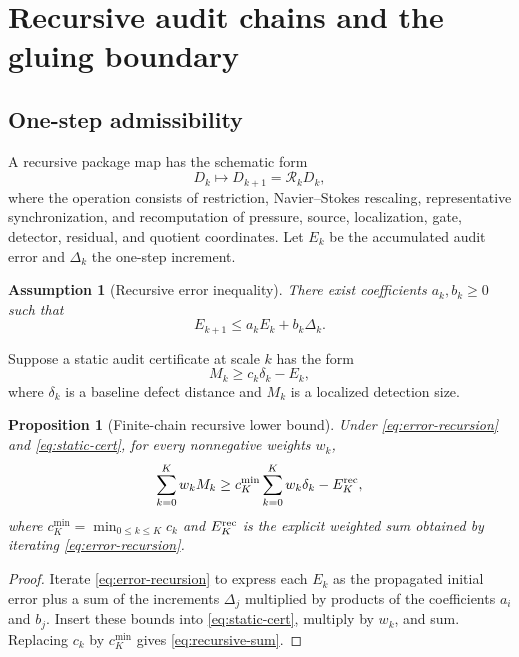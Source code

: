 \documentclass[11pt]{article}
\numberwithin{equation}{section}
\newtheorem{proposition}[theorem]{Proposition}
\newtheorem{assumption}[theorem]{Assumption}
\theoremstyle{remark}
\newcommand{\calR}{\mathcal R}
\begin{document}
\section{Recursive audit chains and the gluing boundary}\label{sec:recursive}

\subsection{One-step admissibility}

A recursive package map has the schematic form
\begin{equation}\label{eq:one-step-map}
D_k\longmapsto D_{k+1}=\calR_kD_k,
\end{equation}
where the operation consists of restriction, Navier--Stokes rescaling, representative synchronization, and recomputation of pressure, source, localization, gate, detector, residual, and quotient coordinates. Let $E_k$ be the accumulated audit error and $\Delta_k$ the one-step increment.

\begin{assumption}[Recursive error inequality]\label{ass:recursive-error}
There exist coefficients $a_k,b_k\ge0$ such that
\begin{equation}\label{eq:error-recursion}
E_{k+1}\le a_kE_k+b_k\Delta_k.
\end{equation}
\end{assumption}

Suppose a static audit certificate at scale $k$ has the form
\begin{equation}\label{eq:static-cert}
M_k\ge c_k\delta_k-E_k,
\end{equation}
where $\delta_k$ is a baseline defect distance and $M_k$ is a localized detection size.

\begin{proposition}[Finite-chain recursive lower bound]\label{prop:recursive-sum}
Under \eqref{eq:error-recursion} and \eqref{eq:static-cert}, for every nonnegative weights $w_k$,
\begin{equation}\label{eq:recursive-sum}
\sum_{k=0}^Kw_kM_k
\ge
c_K^{\min}\sum_{k=0}^Kw_k\delta_k
-
E_K^{\rm rec},
\end{equation}
where $c_K^{\min}=\min_{0\le k\le K}c_k$ and $E_K^{\rm rec}$ is the explicit weighted sum obtained by iterating \eqref{eq:error-recursion}.
\end{proposition}

\begin{proof}
Iterate \eqref{eq:error-recursion} to express each $E_k$ as the propagated initial error plus a sum of the increments $\Delta_j$ multiplied by products of the coefficients $a_i$ and $b_j$. Insert these bounds into \eqref{eq:static-cert}, multiply by $w_k$, and sum. Replacing $c_k$ by $c_K^{\min}$ gives \eqref{eq:recursive-sum}.
\end{proof}
\end{document}
